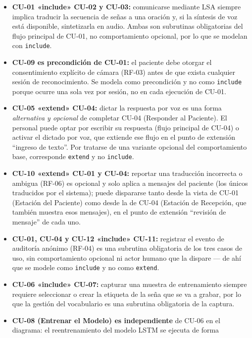 \begin{itemize}
    \item \textbf{CU-01 «include» CU-02 y CU-03:} comunicarse mediante LSA
    siempre implica traducir la secuencia de señas a una oración y, si la
    síntesis de voz está disponible, sintetizarla en audio. Ambas son
    subrutinas obligatorias del flujo principal de CU-01, no
    comportamiento opcional, por lo que se modelan con \texttt{include}.
    \item \textbf{CU-09 es precondición de CU-01:} el paciente debe otorgar
    el consentimiento explícito de cámara (RF-03) antes de que
    exista cualquier sesión de
    reconocimiento. Se modela como precondición y no como \texttt{include}
    porque ocurre una sola vez por sesión, no en cada ejecución de CU-01.
    \item \textbf{CU-05 «extend» CU-04:} dictar la respuesta por voz es una
    forma \emph{alternativa y opcional} de completar CU-04 (Responder al
    Paciente). El personal puede optar por escribir su respuesta (flujo
    principal de CU-04) o activar el dictado por voz, que extiende ese flujo
    en el punto de extensión ``ingreso de texto''. Por tratarse de una
    variante opcional del comportamiento base, corresponde \texttt{extend}
    y no \texttt{include}.
    \item \textbf{CU-10 «extend» CU-01 y CU-04:} reportar una traducción
    incorrecta o ambigua (RF-06) es opcional y solo aplica a
    mensajes del paciente (los únicos traducidos por el sistema); puede
    dispararse tanto desde la vista de CU-01 (Estación del Paciente) como
    desde la de CU-04 (Estación de Recepción, que también muestra esos
    mensajes), en el punto de extensión ``revisión de mensaje'' de cada
    uno.
    \item \textbf{CU-01, CU-04 y CU-12 «include» CU-11:} registrar el evento de
    auditoría anónimo (RF-04) es una subrutina obligatoria de
    los tres casos de uso, sin
    comportamiento opcional ni actor humano que la dispare --- de ahí que se
    modele como \texttt{include} y no como \texttt{extend}.
    \item \textbf{CU-06 «include» CU-07:} capturar una muestra de
    entrenamiento siempre requiere seleccionar o crear la etiqueta de la
    seña que se va a grabar, por lo que la gestión del vocabulario es una
    subrutina obligatoria de la captura.
    \item \textbf{CU-08 (Entrenar el Modelo) es independiente} de CU-06 en el
    diagrama: el reentrenamiento del modelo LSTM se ejecuta de forma

\end{itemize}
